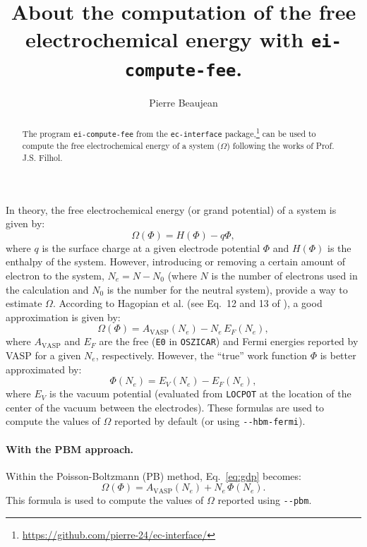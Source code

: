 \documentclass[12pt,a4paper]{article}
\title{About the computation of the free electrochemical energy with \texttt{ei-compute-fee}.}
\author{Pierre Beaujean}
\begin{document}
	\maketitle
	
	\begin{abstract}
		The program \texttt{ei-compute-fee} from the \texttt{ec-interface} package,\footnote{\url{https://github.com/pierre-24/ec-interface/}} can be used to compute the free electrochemical energy of a system ($\Omega$) following the works of Prof. J.S. Filhol. 
	\end{abstract}
	
	In theory, the free electrochemical energy (or grand potential) of a system is given by:\begin{equation}
		\Omega(\Phi) = H(\Phi) - q\Phi,\label{eq:gdp}
	\end{equation}
	where $q$ is the surface charge at a given electrode potential $\Phi$ and $H(\Phi)$ is the enthalpy of the system. However, introducing or removing a certain amount of electron to the system, $N_e = N - N_0$ (where $N$ is the number of electrons used in the calculation and $N_0$ is the number for the neutral system), provide a way to estimate $\Omega$. According to Hagopian et al. (see Eq.~12 and 13 of \cite{hagopianAdvancementHomogeneousBackground2022}), a good approximation is given by:\begin{equation}
		\Omega(\Phi) = A_{\text{VASP}}(N_e) - N_e\,E_F(N_e),\label{eq:gdp-fermi}
	\end{equation} 
	where $A_{\text{VASP}}$ and $E_F$ are the free (\texttt{E0} in \texttt{OSZICAR}) and Fermi energies reported by VASP for a given $N_e$, respectively. However, the ``true'' work function $\Phi$ is better approximated by:\begin{equation}
		\Phi(N_e) = E_V(N_e)-E_F(N_e),\label{eq:phi}
	\end{equation} 
	where $E_V$ is the vacuum potential (evaluated from \texttt{LOCPOT} at the location of the center of the vacuum between the electrodes). These formulas are used to compute the values of $\Omega$ reported by default (or using \texttt{\lstinline|--hbm-fermi|}).
	
	\paragraph{With the PBM approach.} Within the Poisson-Boltzmann (PB) method, Eq.~\eqref{eq:gdp} becomes:\begin{equation}
		\Omega(\Phi) = A_{\text{VASP}}(N_e) + N_e\,\Phi(N_e). \label{eq:gdp-pbm}
	\end{equation}
	This formula is used to compute the values of $\Omega$ reported using  \texttt{\lstinline|--pbm|}.
	
\end{document}
